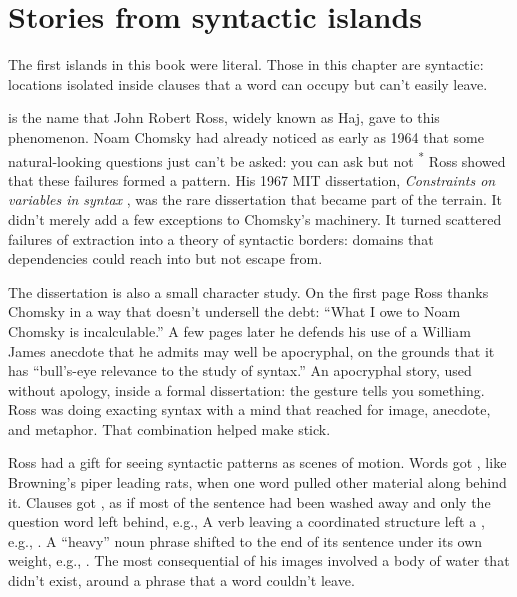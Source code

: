 \chapter{Stories from syntactic islands} \label{sec:extraction-islands}
The first islands in this book were literal. Those in this chapter are syntactic:
locations isolated inside clauses that a word can occupy but can't easily leave.

 is the name that John Robert Ross, widely known as Haj, gave to this phenomenon. Noam Chomsky had already noticed as early as 1964 that some natural-looking questions just can't be asked: you can ask  but not \textsuperscript{*} Ross showed that these failures formed a pattern. His 1967 MIT dissertation, \textit{Constraints on variables in syntax} \citep{Ross1967}, was the rare dissertation that became part of the terrain. It didn't merely add a few exceptions to Chomsky's machinery. It turned scattered failures of extraction into a theory of syntactic borders: domains that dependencies could reach into but not escape from.

The dissertation is also a small character study. On the first page Ross thanks Chomsky in a way that doesn't undersell the debt: \enquote{What I owe to Noam Chomsky is incalculable.} A few pages later he defends his use of a William James anecdote that he admits may well be apocryphal, on the grounds that it has \enquote{bull's-eye relevance to the study of syntax.} An apocryphal story, used without apology, inside a formal dissertation: the gesture tells you something. Ross was doing exacting syntax with a mind that reached for image, anecdote, and metaphor. That combination helped make  stick.

Ross had a gift for seeing syntactic patterns as scenes of motion. Words got , like Browning's piper leading rats, when one word pulled other material along behind it. Clauses got , as if most of the sentence had been washed away and only the question word left behind, e.g.,  A verb leaving a coordinated structure left a , e.g., . A \enquote{heavy} noun phrase shifted to the end of its sentence under its own weight, e.g., . The most consequential of his images involved a body of water that didn't exist, around a phrase that a word couldn't leave. 

